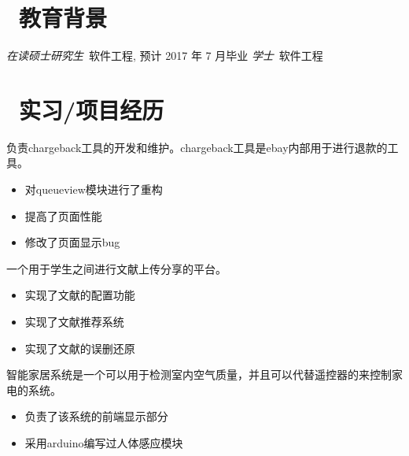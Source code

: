 \documentclass{resume}
\begin{document}



\section{\faGraduationCap\  教育背景}
\textit{在读硕士研究生}\ 软件工程, 预计 2017 年 7 月毕业
\textit{学士}\ 软件工程

\section{\faUsers\ 实习/项目经历}
\role{实习}{软件开发}
负责chargeback工具的开发和维护。chargeback工具是ebay内部用于进行退款的工具。
\begin{itemize}
  \item 对queueview模块进行了重构
  \item 提高了页面性能
  \item 修改了页面显示bug
\end{itemize}

\begin{onehalfspacing}
一个用于学生之间进行文献上传分享的平台。
\begin{itemize}
  \item 实现了文献的配置功能
  \item 实现了文献推荐系统
  \item 实现了文献的误删还原
\end{itemize}
\end{onehalfspacing}


\begin{onehalfspacing}
智能家居系统是一个可以用于检测室内空气质量，并且可以代替遥控器的来控制家电的系统。
\begin{itemize}
  \item 负责了该系统的前端显示部分
  \item 采用arduino编写过人体感应模块
\end{itemize}
\end{onehalfspacing}
\end{document}
